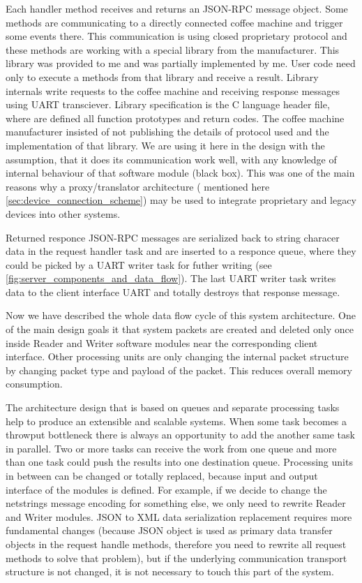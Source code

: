 Each handler method receives and returns an JSON-RPC message object. 
Some methods are communicating to a directly connected coffee machine and trigger some events there.
This communication is using closed proprietary protocol and these methods are working with a special library from the manufacturer.
This library was provided to me and was partially implemented by me.
User code need only to execute a methods from that library and receive a result.
Library internals write requests to the coffee machine and receiving response messages using UART transciever.
Library specification is the C language header file, where are defined all function prototypes and return codes. 
The coffee machine manufacturer insisted of not publishing the details of protocol used and the implementation of that library.
We are using it here in the design with the assumption, that it does its communication work well, with any knowledge of internal behaviour of that software module (black box).
This was one of the main reasons why a proxy/translator architecture ( mentioned here \ref{sec:device_connection_scheme}) may be used to integrate proprietary and legacy devices into other systems.

Returned responce JSON-RPC messages are serialized back to string characer data in the request handler task and are inserted to a responce queue, where they could be picked by a UART writer task for futher writing
(see \autoref{fig:server_components_and_data_flow}).
The last UART writer task writes data to the client interface UART and totally destroys that response message.

Now we have described the whole data flow cycle of this system architecture.
One of the main design goals it that system packets are created and deleted only once inside Reader and Writer software modules near the corresponding client interface.
Other processing units are only changing the internal packet structure by changing packet type and payload of the packet.
This reduces overall memory consumption.

The architecture design that is based on queues and separate processing tasks help to produce an extensible and scalable systems.
When some task becomes a throwput bottleneck there is always an opportunity to add the another same task in parallel. 
Two or more tasks can receive the work from one queue and more than one task could push the results into one destination queue.
Processing units in between can be changed or totally replaced, because input and output interface of the modules is defined.
For example, if we decide to change the netstrings message encoding for something else, we  only need to rewrite Reader and Writer modules.
JSON to XML data serialization replacement requires more fundamental changes (because JSON object is used as primary data transfer objects in the request handle methods, therefore you need to rewrite all request methods to solve that problem), but if the underlying communication transport structure is not changed, it is not necessary to touch this part of the system.


